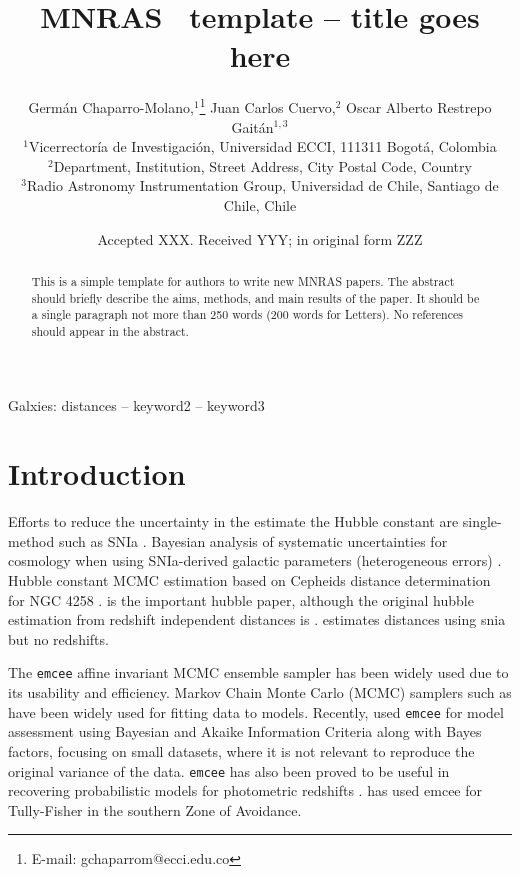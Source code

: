 \documentclass[a4paper,fleqn,usenatbib]{mnras}
\title[Short title, max. 45 characters]{MNRAS \LaTeXe\ template -- title goes here}
\author[G. Chaparro-Molano et al.]{
Germ\'an Chaparro-Molano,$^{1}$\thanks{E-mail: gchaparrom@ecci.edu.co}
Juan Carlos Cuervo,$^{2}$
Oscar Alberto Restrepo Gait\'an$^{1,3}$
\\
$^{1}$Vicerrector\'ia de Investigaci\'on, Universidad ECCI, 111311 Bogot\'a, Colombia\\
$^{2}$Department, Institution, Street Address, City Postal Code, Country\\
$^{3}$Radio Astronomy Instrumentation Group, Universidad de Chile, Santiago de Chile, Chile
}
\date{Accepted XXX. Received YYY; in original form ZZZ}
\begin{document}
\label{firstpage}
\pagerange{\pageref{firstpage}--\pageref{lastpage}}
\maketitle

\begin{abstract}
This is a simple template for authors to write new MNRAS papers.
The abstract should briefly describe the aims, methods, and main results of the paper.
It should be a single paragraph not more than 250 words (200 words for Letters).
No references should appear in the abstract.
\end{abstract}

\begin{keywords}
Galxies: distances -- keyword2 -- keyword3
\end{keywords}



\section{Introduction}

Efforts to reduce the uncertainty in the estimate the Hubble constant are single-method such as SNIa \citet{hubsn2018}. Bayesian analysis of systematic uncertainties for cosmology when using SNIa-derived galactic parameters (heterogeneous errors) \citet{unity}. Hubble constant MCMC estimation based on Cepheids distance determination for NGC 4258 \citet{hubngc}. \citet{hub2010} is the important hubble paper, although the original hubble estimation from redshift independent distances is \citet{huborig}. \citet{ridsn} estimates distances using snia but no redshifts. 

The \texttt{emcee} affine invariant MCMC ensemble sampler \citet{emcee} has been widely used due to its usability and efficiency. Markov Chain Monte Carlo (MCMC) samplers such as \citet{emcee} have been widely used for fitting data to models. Recently, \citet{propprob2018} used \texttt{emcee} for model assessment using Bayesian and Akaike Information Criteria along with Bayes factors, focusing on small datasets, where it is not relevant to reproduce the original variance of the data. \texttt{emcee} has also been proved to be useful in recovering probabilistic models for photometric redshifts \citet{photred1,photred2} . \citet{said} has used emcee for Tully-Fisher in the southern Zone of Avoidance.
\end{document}
